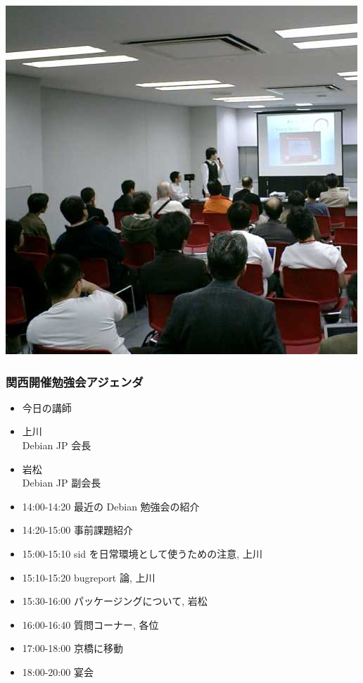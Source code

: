 \documentclass[cjk,dvipdfmx]{beamer}
\begin{document}
\begin{frame}
 \includegraphics[width=0.8\hsize]{image200611/meeting.jpg}
\end{frame}


\begin{frame}
 \frametitle{関西開催勉強会アジェンダ}
\begin{minipage}[t]{0.35\hsize}
  \begin{itemize}
   \item 今日の講師
   \item 上川\\
	 Debian JP 会長
   \item 岩松\\
	 Debian JP 副会長
 \end{itemize}
\end{minipage} 
\begin{minipage}[t]{0.6\hsize}
 \begin{itemize}
  \item 14:00-14:20 最近の Debian 勉強会の紹介
  \item 14:20-15:00 事前課題紹介
  \item 15:00-15:10 sid を日常環境として使うための注意, 上川
  \item 15:10-15:20 bugreport 論, 上川
  \item 15:30-16:00 パッケージングについて, 岩松
  \item 16:00-16:40 質問コーナー, 各位
  \item 17:00-18:00 京橋に移動
  \item 18:00-20:00 宴会
 \end{itemize}
\end{minipage}
\end{frame}
\end{document}
